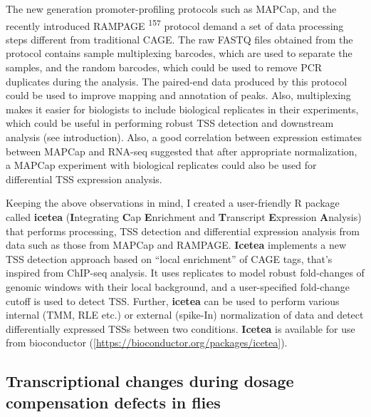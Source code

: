 \documentclass[11pt,twoside]{MPIthesis}
\theoremstyle{definition}
\theoremstyle{definition}
\theoremstyle{definition}
\theoremstyle{remark}
\begin{document}
The new generation promoter-profiling protocols such as MAPCap, and the
recently introduced RAMPAGE \textsuperscript{157} protocol demand a set
of data processing steps different from traditional CAGE. The raw FASTQ
files obtained from the protocol contains sample multiplexing barcodes,
which are used to separate the samples, and the random barcodes, which
could be used to remove PCR duplicates during the analysis. The
paired-end data produced by this protocol could be used to improve
mapping and annotation of peaks. Also, multiplexing makes it easier for
biologists to include biological replicates in their experiments, which
could be useful in performing robust TSS detection and downstream
analysis (see introduction). Also, a good correlation between expression
estimates between MAPCap and RNA-seq suggested that after appropriate
normalization, a MAPCap experiment with biological replicates could also
be used for differential TSS expression analysis.

Keeping the above observations in mind, I created a user-friendly R
package called \textbf{icetea} (\textbf{I}ntegrating \textbf{C}ap
\textbf{E}nrichment and \textbf{T}ranscript \textbf{E}xpression
\textbf{A}nalysis) that performs processing, TSS detection and
differential expression analysis from data such as those from MAPCap and
RAMPAGE. \textbf{Icetea} implements a new TSS detection approach based
on ``local enrichment'' of CAGE tags, that's inspired from ChIP-seq
analysis. It uses replicates to model robust fold-changes of genomic
windows with their local background, and a user-specified fold-change
cutoff is used to detect TSS. Further, \textbf{icetea} can be used to
perform various internal (TMM, RLE etc.) or external (spike-In)
normalization of data and detect differentially expressed TSSs between
two conditions. \textbf{Icetea} is available for use from bioconductor
({[}{\url{https://bioconductor.org/packages/icetea}}{]}).

\subsection{Transcriptional changes during dosage compensation defects
in
flies}\label{transcriptional-changes-during-dosage-compensation-defects-in-flies}
\end{document}
